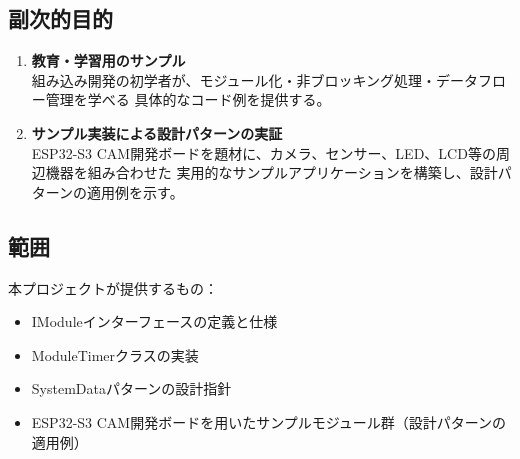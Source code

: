 \subsection{副次的目的}

\begin{enumerate}
    \item \textbf{教育・学習用のサンプル} \\
    組み込み開発の初学者が、モジュール化・非ブロッキング処理・データフロー管理を学べる
    具体的なコード例を提供する。

    \item \textbf{サンプル実装による設計パターンの実証} \\
    ESP32-S3 CAM開発ボードを題材に、カメラ、センサー、LED、LCD等の周辺機器を組み合わせた
    実用的なサンプルアプリケーションを構築し、設計パターンの適用例を示す。
\end{enumerate}

\subsection{範囲}

本プロジェクトが提供するもの：
\begin{itemize}
    \item IModuleインターフェースの定義と仕様
    \item ModuleTimerクラスの実装
    \item SystemDataパターンの設計指針
    \item ESP32-S3 CAM開発ボードを用いたサンプルモジュール群（設計パターンの適用例）
\end{itemize}
